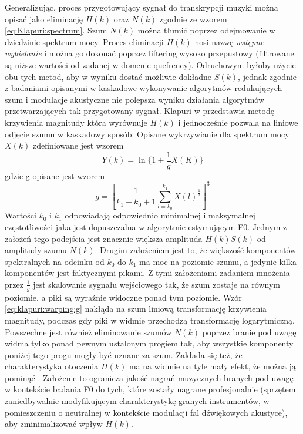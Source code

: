 \documentclass[12pt,a4paper,twoside]{mwart}
\begin{document}
Generalizując, proces przygotowujący sygnał do transkrypcji muzyki można opisać jako eliminację $H(k)$ oraz $N(k)$ zgodnie ze wzorem \ref{eq:Klapuri:spectrum}. Szum $N(k)$ można tłumić poprzez odejmowanie w dziedzinie spektrum mocy. Proces eliminacji $H(k)$ nosi nazwę \textit{wstępne wybielanie} i można go dokonać poprzez liftering wysoko przepustowy (filtrowane są niższe wartości od zadanej w domenie quefrency). Odruchowym byłoby użycie obu tych metod, aby w wyniku dostać możliwie dokładne $S(k)$, jednak zgodnie z badaniami opisanymi w \cite[85-86]{Transcription:Hermansky:RecognitionInNoise} kaskadowe wykonywanie algorytmów redukujących szum i modulacje akustyczne nie polepsza wyniku działania algorytmów przetwarzających tak przygotowany sygnał. Klapuri w \cite[806]{Transcription:Klapuri:MultipleFundamentalFrequencyEstimation} przedstawia metodę krzywienia magnitudy która wyrównuje $H(k)$ i jednocześnie pozwala na liniowe odjęcie szumu w kaskadowy sposób. Opisane wykrzywianie dla spektrum mocy $X(k)$ zdefiniowane jest wzorem
\begin{equation}\label{eq:klapuri:warping}
  Y(k) = \ln\{ 1 + \frac{1}{g}X(K)\}
\end{equation}
gdzie g opisane jest wzorem
\begin{equation}\label{eq:klapuri:warping:g}
  g = [ \frac{1}{k_1 - k_0 + 1} \sum_{l=k_0}^{k_1}X(l)^{\frac{1}{3}}]^3
\end{equation}
Wartości $k_0$ i $k_1$ odpowiadają odpowiednio minimalnej i maksymalnej częstotliwości jaka jest dopuszczalna w algorytmie estymującym F0. Jednym z założeń tego podejścia jest znacznie większa amplituda $H(k)S(k)$ od amplitudy szumu $N(k)$. Drugim założeniem jest to, że większość komponentów spektralnych na odcinku od $k_0$ do $k_1$  ma moc na poziomie szumu, a jedynie kilka komponentów jest faktycznymi pikami. Z tymi założeniami zadaniem mnożenia przez $\frac{1}{g}$ jest skalowanie sygnału wejściowego tak, że szum zostaje na równym poziomie, a piki są wyraźnie widoczne ponad tym poziomie. Wzór \ref{eq:klapuri:warping:g} nakłąda na szum liniową transformację krzywienia magnitudy, podczas gdy piki w widmie przechodzą transformację logarytmiczną. Powszechne jest również eliminowanie szumów $N(k)$ poprzez branie pod uwagę widma tylko ponad pewnym ustalonym progiem tak, aby wszystkie komponenty poniżej tego progu mogły być uznane za szum. Zakłada się też, że charakterystyka otoczenia $H(k)$ ma na widmie na tyle mały efekt, że można ją pominąć \cite{Transcription:Pertus:Inharmonicity}. Założenie to ogranicza jakość nagrań muzycznych branych pod uwagę w kontekście badania F0 do tych, które zostały nagrane profesjonalnie (sprzętem zaniedbywalnie modyfikującym charakterystykę granych instrumentów, w pomieszczeniu o neutralnej w kontekście modulacji fal dźwiękowych akustyce), aby zminimalizować wpływ $H(k)$.
\end{document}
